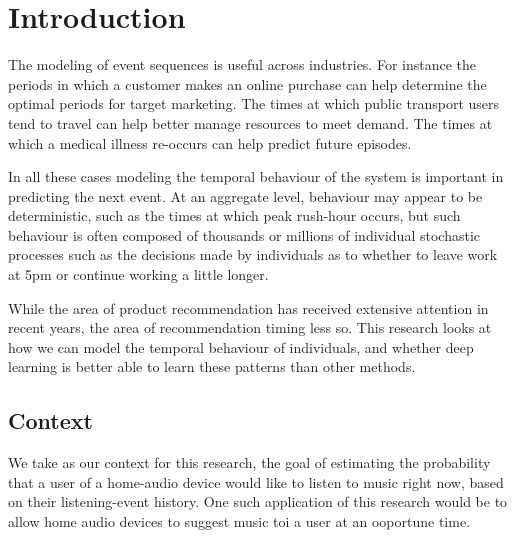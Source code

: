 
\chapter{Introduction} %

\label{Chapter1} %


\newcommand{\keyword}[1]{\textbf{#1}}
\newcommand{\tabhead}[1]{\textbf{#1}}
\newcommand{\code}[1]{\texttt{#1}}
\newcommand{\file}[1]{\texttt{\bfseries#1}}
\newcommand{\option}[1]{\texttt{\itshape#1}}

The modeling of event sequences is useful across industries. For instance the periods in which a customer makes an online purchase can help determine the optimal periods for target marketing. The times at which public transport users tend to travel can help better manage resources to meet demand. The times at which a medical illness re-occurs can help predict future episodes.
 
In all these cases modeling the temporal behaviour of the system is important in predicting the next event. At an aggregate level, behaviour may appear to be deterministic, such as the times at which peak rush-hour occurs, but such behaviour is often composed of thousands or millions of individual stochastic processes such as the decisions made by individuals as to whether to leave work at 5pm or continue working a little longer.

While the area of product recommendation has received extensive attention in recent years, the area of recommendation timing less so. This research looks at how we can model the temporal behaviour of individuals, and whether deep learning is better able to learn these patterns than other methods.

\section{Context}

We take as our context for this research, the goal of estimating the probability that a user of a home-audio device would like to listen to music right now, based on their listening-event history. One such application of this research would be to allow home audio devices to suggest music toi a user at an ooportune time.

